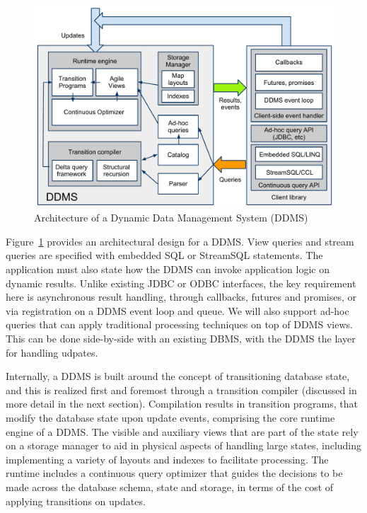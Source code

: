 \begin{figure}
\begin{center}
\includegraphics[scale=0.35]{graphics/CIDRarch.pdf}
\end{center}
\caption{Architecture of a Dynamic Data Management System (DDMS)}
\label{fig:ddmsarch}
\end{figure}


Figure~\ref{fig:ddmsarch} provides an architectural design for a DDMS. View
queries and stream queries are specified with embedded SQL or StreamSQL
statements. The application must also state how the DDMS can invoke application
logic on dynamic results. Unlike existing JDBC or ODBC interfaces, the key
requirement here is asynchronous result handling, through callbacks, futures and
promises, or via registration on a DDMS event loop and queue. We will also
support ad-hoc queries that can apply traditional processing techniques on top
of DDMS views. This can be done side-by-side with an existing DBMS, with the
DDMS the layer for handling udpates.








Internally, a DDMS is built around the concept of transitioning database state,
and this is realized first and foremost through a transition compiler (discussed
in more detail in the next section). Compilation results in transition programs,
that modify the database state upon update events, comprising the core runtime
engine of a DDMS. The visible and auxiliary views that are part of the state
rely on a storage manager to aid in physical aspects of handling large states,
including implementing a variety of layouts and indexes to facilitate
processing. The runtime includes a continuous query optimizer that guides the
decisions to be made across the database schema, state and storage, in terms of
the cost of applying transitions on updates.










